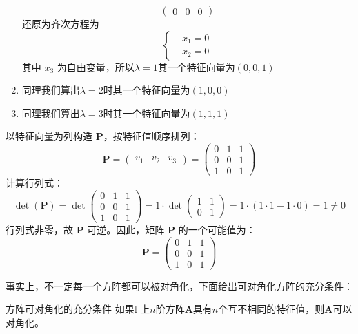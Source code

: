 \begin{example}
\begin{enumerate}
$$\begin{pmatrix}
				0 & 0 & 0
			\end{pmatrix}$$还原为齐次方程为$$\left\{\begin{matrix} 
				-x_1 = 0 \\  
				-x_2 = 0
			\end{matrix}\right. $$ 其中 $x_3$ 为自由变量，所以$\lambda = 1$其一个特征向量为$(0,0,1)$
			\item 同理我们算出$\lambda =2$时其一个特征向量为$(1,0,0)$
			\item 同理我们算出$\lambda =3$时其一个特征向量为$(1,1,1)$
		   	\end{enumerate}
			以特征向量为列构造 $\mathbf{P}$，按特征值顺序排列：$$\mathbf{P} = \begin{pmatrix} v_1 & v_2 & v_3 \end{pmatrix} = \begin{pmatrix} 0 & 1 & 1 \\ 0 & 0 & 1 \\ 1 & 0 & 1 \end{pmatrix}$$计算行列式：$$\det(\mathbf{P}) = \det \begin{pmatrix} 0 & 1 & 1 \\ 0 & 0 & 1 \\ 1 & 0 & 1 \end{pmatrix} = 1 \cdot \det \begin{pmatrix} 1 & 1 \\ 0 & 1 \end{pmatrix} = 1 \cdot (1 \cdot 1 - 1 \cdot 0) = 1 \neq 0$$行列式非零，故 $\mathbf{P}$ 可逆。因此，矩阵 $\mathbf{P}$ 的一个可能值为：$$\mathbf{P}=\begin{pmatrix} 0 & 1 & 1 \\ 0 & 0 & 1 \\ 1 & 0 & 1 \end{pmatrix}$$
\end{example}

事实上，不一定每一个方阵都可以被对角化，下面给出可对角化方阵的充分条件：

\begin{theorem}{方阵可对角化的充分条件}
	如果$\mathbb{F}$上$n$阶方阵$\mathbf{A}$具有$n$个互不相同的特征值，则$\mathbf{A}$可以对角化。
\end{theorem}

